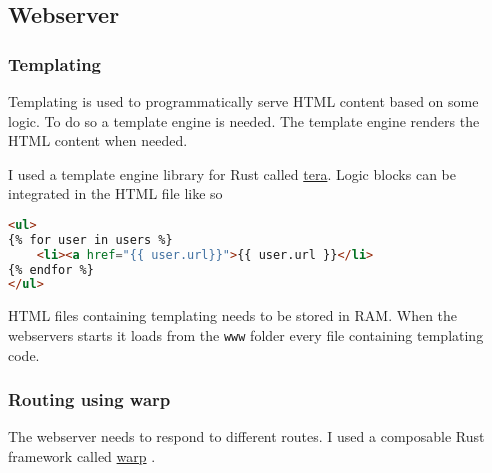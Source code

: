 \documentclass[../documentation.tex]{subfiles}
\begin{document}
\pagebreak

\subsection{Webserver}

\subsubsection{Templating}

Templating is used to programmatically serve HTML content based on some logic.
To do so a template engine is needed. The template engine renders the HTML content
when needed.

I used a template engine library for Rust called
\href{https://github.com/Keats/tera}{tera}.
Logic blocks can be integrated in the HTML file like so
\begin{lstlisting}[language=html]
<ul>
{% for user in users %}
    <li><a href="{{ user.url}}">{{ user.url }}</li>
{% endfor %}
</ul>
\end{lstlisting}

HTML files containing templating needs to be stored in RAM.
When the webservers starts it loads from the \texttt{www} folder
every file containing templating code.

\subsubsection{Routing using warp}

The webserver needs to respond to different routes.
I used a composable Rust framework called
\href{https://github.com/seanmonstar/warp}{warp} \cite{warp}.
\end{document}
